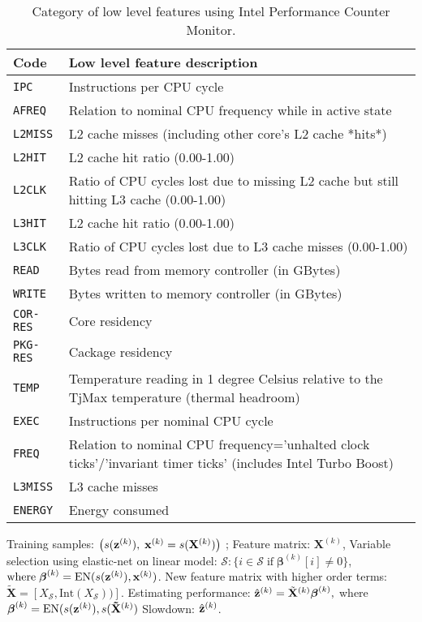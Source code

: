 \begin{table*}[htp!]
\centering
\footnotesize
\caption{Category of low level features using Intel Performance Counter Monitor. }
\begin{tabular}{ ll }
 \hline
 \hline
 \bf{Code} & \bf{Low level feature description} \\

 \hline
 \texttt{IPC}   & Instructions per CPU cycle    \\
 \texttt{AFREQ} & Relation to nominal CPU frequency while in active state    \\
 \texttt{L2MISS}& L2 cache misses (including other core's L2 cache *hits*)   \\
\texttt{L2HIT}  & L2 cache hit ratio (0.00-1.00)  \\
 \texttt{L2CLK} & Ratio of CPU cycles lost due to missing L2 cache but still hitting L3 cache (0.00-1.00)  \\
 \texttt{L3HIT} & L2 cache hit ratio (0.00-1.00)  \\
  \texttt{L3CLK}& Ratio of CPU cycles lost due to L3 cache misses (0.00-1.00)  \\
 \texttt{READ}  & Bytes read from memory controller (in GBytes) \\
 \texttt{WRITE} & Bytes written to memory controller (in GBytes)  \\
 \texttt{COR-RES}  &  Core residency  \\
\texttt{PKG-RES}  &  Cackage residency   \\
 \texttt{TEMP}  &  Temperature reading in 1 degree Celsius relative to the TjMax temperature (thermal headroom) \\
\texttt{EXEC}  &  Instructions per nominal CPU cycle \\
\texttt{FREQ}  &  Relation to nominal CPU frequency='unhalted clock ticks'/'invariant timer ticks' (includes Intel Turbo Boost) \\
\texttt{L3MISS}  &  L3 cache misses \\
\texttt{ENERGY}  &  Energy consumed  \\
 \hline
 \hline
\end{tabular}
\label{llf-table}
\end{table*}

\begin{algorithm}[!t]
\caption{\SYSTEM }
\begin{algorithmic}[1]
\REQUIRE  Training samples: $\left( s(\mathbf{z}^{(k)}), \; \mathbf{x}^{(k)} = s(\mathbf{X}^{(k)}) \right)$ ; Feature matrix: $\mathbf{X}^{(k)}$,
	\STATE Variable selection using elastic-net on linear model:  $\mathcal{S}: \{ i \in \mathcal{S} \; \text{if} \; \boldsymbol{\beta}^{(k)}[i] \neq 0\}$, $ \text{where} \; \boldsymbol{\beta}^{(k)} = \text{EN}(s(\mathbf{z}^{(k)}), \mathbf{x}^{(k)})$.
	\STATE New feature matrix with higher order terms:  $\tilde{\mathbf{X}} = [X_{\mathcal{S}},\text{Int}(X_{\mathcal{S}} ) )]$.
	\STATE Estimating performance: $\hat{\mathbf{z}}^{(k)} = \tilde{\mathbf{X}}^{(k)}\boldsymbol{\beta}^{(k)}, $ where $\boldsymbol{\beta}^{(k)} = \text{EN}(s(\mathbf{z}^{(k)}), s(\mathbf{\tilde{X}}^{(k)})$
\RETURN Slowdown: $\hat{\mathbf{z}}^{(k)}$.
\end{algorithmic}
\label{alg:SYSTEM}
\end{algorithm}

